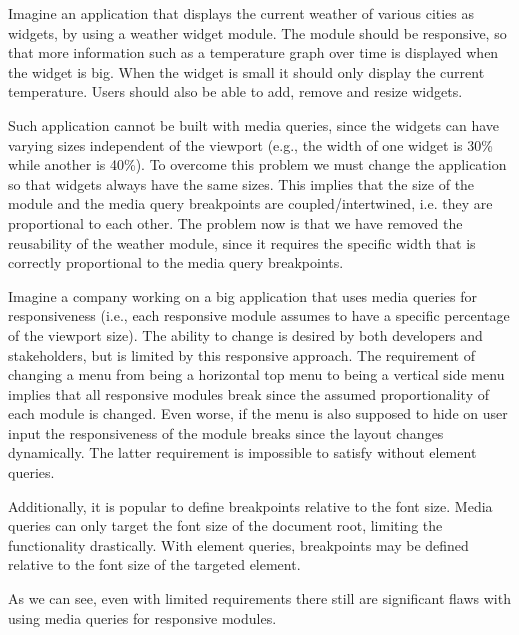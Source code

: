 \documentclass{acm_proc_article-sp}
\begin{document}
    Imagine an application that displays the current weather of various cities as widgets, by using a weather widget module.
    The module should be responsive, so that more information such as a temperature graph over time is displayed when the widget is big.
    When the widget is small it should only display the current temperature.
    Users should also be able to add, remove and resize widgets.

    Such application cannot be built with media queries, since the widgets can have varying sizes independent of the viewport (e.g., the width of one widget is 30\% while another is 40\%).
    To overcome this problem we must change the application so that widgets always have the same sizes.
    This implies that the size of the module and the media query breakpoints are coupled/intertwined, i.e. they are proportional to each other.
    The problem now is that we have removed the reusability of the weather module, since it requires the specific width that is correctly proportional to the media query breakpoints. 

    Imagine a company working on a big application that uses media queries for responsiveness (i.e., each responsive module assumes to have a specific percentage of the viewport size).
    The ability to change is desired by both developers and stakeholders, but is limited by this responsive approach.
    The requirement of changing a menu from being a horizontal top menu to being a vertical side menu implies that all responsive modules break since the assumed proportionality of each module is changed.
    Even worse, if the menu is also supposed to hide on user input the responsiveness of the module breaks since the layout changes dynamically.
    The latter requirement is impossible to satisfy without element queries.

    Additionally, it is popular to define breakpoints relative to the font size.
    Media queries can only target the font size of the document root, limiting the functionality drastically.
    With element queries, breakpoints may be defined relative to the font size of the targeted element.

    As we can see, even with limited requirements there still are significant flaws with using media queries for responsive modules.
\end{document}
